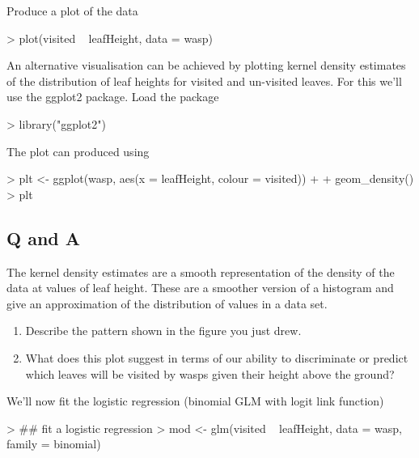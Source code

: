 \documentclass[a4paper,10pt]{article}
\begin{document}
Produce a plot of the data

\begin{Schunk}
\begin{Sinput}
> plot(visited ~ leafHeight, data = wasp)
\end{Sinput}
\end{Schunk}

An alternative visualisation can be achieved by plotting kernel density estimates of the distribution of leaf heights for visited and un-visited leaves. For this we'll use the \textsf{ggplot2} package. Load the package

\begin{Schunk}
\begin{Sinput}
> library("ggplot2")
\end{Sinput}
\end{Schunk}

The plot can produced using

\begin{Schunk}
\begin{Sinput}
> plt <- ggplot(wasp, aes(x = leafHeight, colour = visited)) +
+     geom_density()
> plt
\end{Sinput}
\end{Schunk}

\subsection*{Q and A}
The kernel density estimates are a smooth representation of the density of the data at values of leaf height. These are a smoother version of a histogram and give an approximation of the distribution of values in a data set.

\begin{enumerate}
\item Describe the pattern shown in the figure you just drew.
\item What does this plot suggest in terms of our ability to discriminate or predict which leaves will be visited by wasps given their height above the ground?
\end{enumerate}

We'll now fit the logistic regression (binomial GLM with logit link function)

\begin{Schunk}
\begin{Sinput}
> ## fit a logistic regression
> mod <- glm(visited ~ leafHeight, data = wasp, family = binomial)
\end{Sinput}
\end{Schunk}
\end{document}
